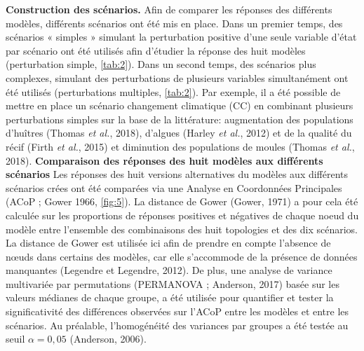 \documentclass[12pt]{report}
\begin{document}
\textbf{Construction des scénarios.} Afin de comparer les réponses des différents modèles, différents scénarios ont été mis en place. Dans un premier temps, des scénarios « simples » simulant la perturbation positive d'une seule variable d'état par scénario ont été utilisés afin d’étudier la réponse des huit modèles (perturbation simple, \autoref{tab:2}). Dans un second temps, des scénarios plus complexes, simulant des perturbations de plusieurs variables simultanément ont été utilisés (perturbations multiples, \autoref{tab:2}). Par exemple, il a été possible de mettre en place un scénario changement climatique (CC) en combinant plusieurs perturbations simples sur la base de la littérature: augmentation des populations d’huîtres (Thomas \textit{et al.}, 2018), d’algues (Harley \textit{et al.}, 2012) et de la qualité du récif (Firth \textit{et al.}, 2015) et diminution des populations de moules (Thomas \textit{et al.}, 2018). 
\newline \newline
 \textbf{Comparaison des réponses des huit modèles aux différents scénarios} Les réponses des huit versions alternatives du modèles aux différents scénarios crées ont été comparées via une Analyse en Coordonnées Principales (ACoP ; Gower 1966, \autoref{fig:5}). La distance de Gower (Gower, 1971) a pour cela été calculée sur les proportions de réponses positives et négatives de chaque noeud du modèle entre l'ensemble des combinaisons des huit topologies et des dix scénarios. La distance de Gower est utilisée ici afin de prendre en compte l’absence de nœuds dans certains des modèles, car elle s’accommode de la présence de données manquantes (Legendre et Legendre, 2012). De plus, une analyse de variance multivariée par permutations (PERMANOVA ; Anderson, 2017) basée sur les valeurs médianes de chaque groupe, a été utilisée pour quantifier et tester la significativité des différences observées sur l’ACoP entre les modèles et entre les scénarios. Au préalable, l’homogénéité des variances par groupes a été testée au seuil $\alpha = 0,05$ (Anderson, 2006).

\bigbreak
\end{document}
